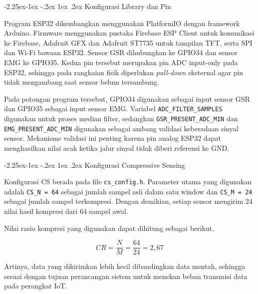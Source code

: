 \documentclass[12pt,a4paper]{report}
\makeatletter
\renewcommand{\subsection}{\@startsection{subsection}{2}{\z@}%
  {-2.25ex\@plus -1ex \@minus -.2ex}%
  {1ex \@plus .2ex}%
  {\normalfont\bfseries\fontsize{12}{14}\selectfont}}
\makeatother
\begin{document}
\subsection{Konfigurasi Library dan Pin}

Program ESP32 dikembangkan menggunakan PlatformIO dengan framework Arduino. Firmware
menggunakan pustaka Firebase ESP Client untuk komunikasi ke Firebase, Adafruit GFX dan
Adafruit ST7735 untuk tampilan TFT, serta SPI dan Wi-Fi bawaan ESP32. Sensor GSR
dihubungkan ke GPIO34 dan sensor EMG ke GPIO35. Kedua pin tersebut merupakan pin ADC
input-only pada ESP32, sehingga pada rangkaian fisik diperlukan \textit{pull-down}
eksternal agar pin tidak mengambang saat sensor belum tersambung.



Pada potongan program tersebut, GPIO34 digunakan sebagai input sensor GSR dan GPIO35
sebagai input sensor EMG. Variabel \texttt{ADC\_FILTER\_SAMPLES} digunakan untuk proses
median filter, sedangkan \texttt{GSR\_PRESENT\_ADC\_MIN} dan
\texttt{EMG\_PRESENT\_ADC\_MIN} digunakan sebagai ambang validasi keberadaan sinyal
sensor. Mekanisme validasi ini penting karena pin analog ESP32 dapat menghasilkan nilai
acak ketika jalur sinyal tidak diberi referensi ke GND.

\subsection{Konfigurasi Compressive Sensing}

Konfigurasi CS berada pada file \texttt{cs\_config.h}. Parameter utama yang digunakan
adalah \texttt{CS\_N = 64} sebagai jumlah sampel asli dalam satu window dan
\texttt{CS\_M = 24} sebagai jumlah sampel terkompresi. Dengan demikian, setiap sensor
mengirim 24 nilai hasil kompresi dari 64 sampel awal.



Nilai rasio kompresi yang digunakan dapat dihitung sebagai berikut.

\[
CR = \frac{N}{M} = \frac{64}{24} = 2{,}67
\]

Artinya, data yang dikirimkan lebih kecil dibandingkan data mentah, sehingga sesuai
dengan tujuan perancangan sistem untuk menekan beban transmisi data pada perangkat IoT.
\end{document}
